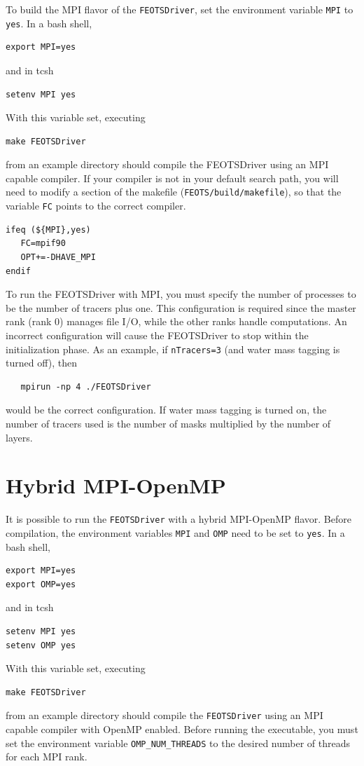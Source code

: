 \documentclass{softwaremanual}
\begin{document}
To build the MPI flavor of the \texttt{FEOTSDriver}, set the environment variable \texttt{MPI} to \texttt{yes}. In a bash shell,
\begin{verbatim}
export MPI=yes
\end{verbatim} 
and in tcsh
\begin{verbatim}
setenv MPI yes
\end{verbatim}
With this variable set, executing
\begin{verbatim}
make FEOTSDriver
\end{verbatim}
from an example directory should compile the FEOTSDriver using an MPI capable compiler. If your compiler is not in your default search path, you will need to modify a section of the makefile (\texttt{FEOTS/build/makefile}), so that the variable \texttt{FC} points to the correct compiler.
\begin{verbatim}
ifeq (${MPI},yes)
   FC=mpif90
   OPT+=-DHAVE_MPI
endif
\end{verbatim}

To run the FEOTSDriver with MPI, you must specify the number of processes to be the number of tracers plus one. This configuration is required since the master rank (rank 0) manages file I/O, while the other ranks handle computations. An incorrect configuration will cause the FEOTSDriver to stop within the initialization phase. As an example, if \texttt{nTracers=3} (and water mass tagging is turned off), then
\begin{verbatim}
   mpirun -np 4 ./FEOTSDriver
\end{verbatim}
would be the correct configuration. If water mass tagging is turned on, the number of tracers used is the number of masks multiplied by the number of layers.


\section{Hybrid MPI-OpenMP}
It is possible to run the \texttt{FEOTSDriver} with a hybrid MPI-OpenMP flavor. Before compilation, the environment variables \texttt{MPI} and \texttt{OMP} need to be set to \texttt{yes}. In a bash shell,
\begin{verbatim}
export MPI=yes
export OMP=yes
\end{verbatim} 
and in tcsh
\begin{verbatim}
setenv MPI yes
setenv OMP yes
\end{verbatim}
With this variable set, executing
\begin{verbatim}
make FEOTSDriver
\end{verbatim}
from an example directory should compile the \texttt{FEOTSDriver} using an MPI capable compiler with OpenMP enabled. Before running the executable, you must set the environment variable \texttt{OMP\_NUM\_THREADS} to the desired number of threads for each MPI rank.\\
\end{document}

